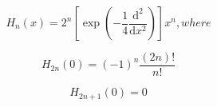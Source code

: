 \[\begin{equation} \label{thrm5.3(i)} H_n(x) = 2^n[\exp{(-\frac{1}{4}\frac{\mathrm{d}^2}{\mathrm{d}x^2})}]x^n, where \end{equation}\]

\[\begin{equation} \label{thrm5.4(i)} H_{2n}(0) = (-1)^n\frac{(2n)!}{n!} \end{equation}\]

\[\begin{equation} \label{thrm5.4(ii)} H_{2n+1}(0) = 0 \end{equation}\]
